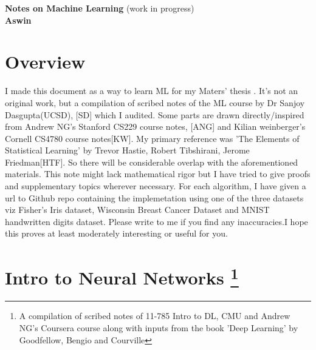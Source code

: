 \documentclass[12pt]{article}
\begin{document}
	
	   
	     
	
		\enlargethispage{2cm}
		
		\begin{center}
			
			\vspace*{-1cm}
			
			\textbf{\Large Notes on Machine Learning     }(work in progress)\\[10pt]
			

\textbf{\Large Aswin}\\ [8pt]			
			
			\end{center}
		
\cleardoublepage

\tableofcontents
\newpage

\section{Overview}

I made this document as a way to learn ML for my Maters' thesis . It’s not an original work, but a compilation of scribed notes of the ML course by Dr Sanjoy Dasgupta(UCSD), [SD] which I audited. Some parts are drawn directly/inspired from Andrew NG's Stanford CS229 course notes, [ANG] and Kilian weinberger's Cornell CS4780 course notes[KW]. My primary reference was 'The Elements of Statistical Learning' by Trevor Hastie, Robert Tibshirani, Jerome Friedman[HTF]. So there will be considerable overlap with the aforementioned materials. This note might lack mathematical rigor but I have tried to give proofs and supplementary topics wherever necessary. For each algorithm, I have given a url to Github repo containing the implemetation using one of the three datasets viz Fisher's Iris dataset, Wisconsin Breast Cancer Dataset and MNIST handwritten digits dataset.
Please write to me if you find any inaccuracies.I hope this   proves at least moderately
interesting or useful for you.

\cleardoublepage







\section[title]{Intro to Neural Networks \footnote{A compilation of scribed notes of 11-785 Intro to DL, CMU and Andrew NG's Coursera course along with inputs from  the book 'Deep Learning' by Goodfellow, Bengio and Courville }}
\end{document}
